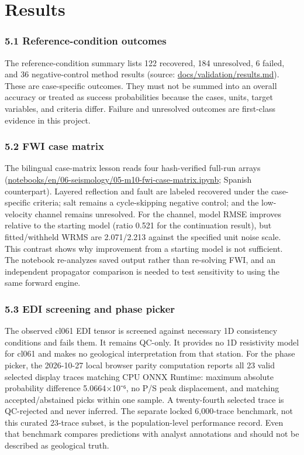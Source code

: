 \section{Results}\label{selected-results-and-interpretation}

\subsubsection{5.1 Reference-condition
outcomes}\label{reference-condition-outcomes}

The reference-condition summary lists 122 recovered, 184 unresolved, 6
failed, and 36 negative-control method results (source:
\url{docs/validation/results.md}). These are case-specific outcomes.
They must not be summed into an overall accuracy or treated as success
probabilities because the cases, units, target variables, and criteria
differ. Failure and unresolved outcomes are first-class evidence in this
project.

\subsubsection{5.2 FWI case matrix}\label{fwi-case-matrix}

The bilingual case-matrix lesson reads four hash-verified full-run
arrays (\url{notebooks/en/06-seismology/05-m10-fwi-case-matrix.ipynb};
Spanish counterpart). Layered reflection and fault are labeled recovered
under the case-specific criteria; salt remains a cycle-skipping negative
control; and the low-velocity channel remains unresolved. For the
channel, model RMSE improves relative to the starting model (ratio 0.521
for the continuation result), but fitted/withheld WRMS are 2.071/2.213
against the specified unit noise scale. This contrast shows why
improvement from a starting model is not sufficient. The notebook
re-analyzes saved output rather than re-solving FWI, and an independent
propagator comparison is needed to test sensitivity to using the same
forward engine.

\subsubsection{5.3 EDI screening and phase
picker}\label{edi-screening-and-phase-picker}

The observed cl061 EDI tensor is screened against necessary 1D
consistency conditions and fails them. It remains QC-only. It provides
no 1D resistivity model for cl061 and makes no geological interpretation
from that station. For the phase picker, the 2026-10-27 local browser parity
computation reports all 23 valid selected display traces matching CPU
ONNX Runtime: maximum absolute probability difference 5.0664×10⁻⁶, no
P/S peak displacement, and matching accepted/abstained picks within one
sample. A twenty-fourth selected trace is QC-rejected and never
inferred. The separate locked 6,000-trace benchmark, not this curated
23-trace subset, is the population-level performance record. Even that
benchmark compares predictions with analyst annotations and should not
be described as geological truth.

